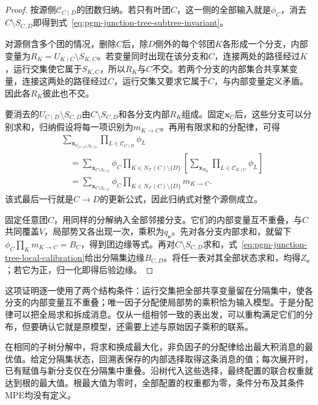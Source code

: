 \begin{proof}
  按源侧$\mathcal C_{C\mid D}$的团数归纳。若只有叶团$C$，这一侧的全部输入就是$\phi_C$，消去$C\setminus S_{C,D}$即得到式~\eqref{eq:pgm-junction-tree-subtree-invariant}。

  对源侧含多个团的情况，删除$C$后，除$D$侧外的每个邻团$K$各形成一个分支，内部变量为$R_K=U_{K\mid C}\setminus S_{K,C}$。若变量同时出现在该分支和$C$，连接两处的路径经过$K$，运行交集使它属于$S_{K,C}$，所以$R_K$与$C$不交。若两个分支的内部集合共享某变量，连接这两处的路径经过$C$，运行交集又要求它属于$C$，与内部变量定义矛盾。因此各$R_K$彼此也不交。

  要消去的$U_{C\mid D}\setminus S_{C,D}$由$C\setminus S_{C,D}$和各分支内部$R_K$组成。固定$\bm{x}_C$后，这些分支可以分别求和，归纳假设将每一项识别为$m_{K\to C}$。再用有限求和的分配律，可得
  \[
    \begin{aligned}
      &\sum_{\bm{x}_{U_{C\mid D}\setminus S_{C,D}}}
         \prod_{L\in\mathcal{C}_{C\mid D}}\phi_L\\
      &\quad=\sum_{\bm{x}_{C\setminus S_{C,D}}}\phi_C
         \prod_{K\in N_{\mathcal{T}}(C)\setminus\{D\}}
          \left[
            \sum_{\bm{x}_{R_K}}
              \prod_{L\in\mathcal{C}_{K\mid C}}\phi_L
          \right]\\
      &\quad=\sum_{\bm{x}_{C\setminus S_{C,D}}}\phi_C
         \prod_{K\in N_{\mathcal{T}}(C)\setminus\{D\}}m_{K\to C}.
    \end{aligned}
  \]
  该式最后一行就是$C\to D$的更新公式，因此归纳式对整个源侧成立。

  固定任意团$C$，用同样的分解纳入全部邻接分支。它们的内部变量互不重叠，与$C$共同覆盖$V$，局部势又各出现一次，乘积为$q_{\bm e}$。先对各分支内部求和，就留下$\phi_C\prod_Km_{K\to C}=B_C$，得到团边缘等式。再对$C\setminus S_{C,D}$求和，式~\eqref{eq:pgm-junction-tree-local-calibration}给出分隔集边缘$B_{C,D}$。将任一表对其全部状态求和，均得$Z_{\bm e}$；若它为正，归一化即得后验边缘。
\end{proof}

这项证明逐一使用了两个结构条件：运行交集把全部共享变量留在分隔集中，使各分支的内部变量互不重叠；唯一因子分配使局部势的乘积恰为输入模型。于是分配律可以把全局求和拆成消息。仅从一组相邻一致的表出发，可以重构满足它们的分布，但要确认它就是原模型，还需要上述与原始因子乘积的联系。

在相同的子树分解中，将求和换成最大化，非负因子的分配律给出最大积消息的最优值。给定分隔集状态，回溯表保存的内部选择取得这条消息的值；每次展开时，已有赋值与新分支仅在分隔集中重叠。沿树代入这些选择，最终配置的联合权重就达到根的最大值。根最大值为零时，全部配置的权重都为零，条件分布及其条件MPE均没有定义。

